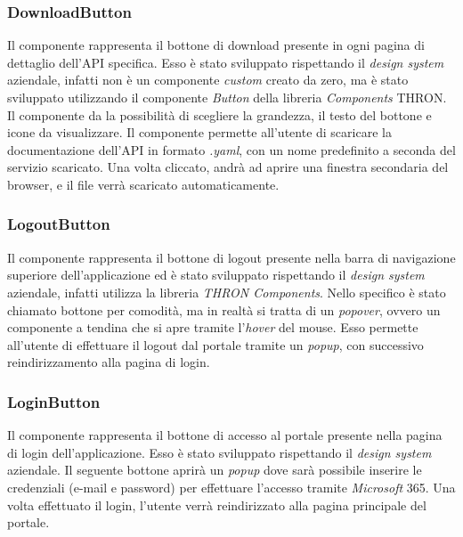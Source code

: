 \subsubsection{DownloadButton}\label{subsubsec:download-button}
Il componente rappresenta il bottone di download presente in ogni pagina di dettaglio dell'API specifica. Esso è stato sviluppato rispettando il \textit{design system}
aziendale, infatti non è un componente \textit{custom} creato da zero, ma è stato sviluppato utilizzando il componente \textit{Button} della libreria \textit{Components} THRON.
Il componente da la possibilità di scegliere la grandezza, il testo del bottone e icone da visualizzare.
Il componente permette all'utente di scaricare la documentazione dell'API in formato \textit{.yaml}, con un nome predefinito a seconda 
del servizio scaricato. Una volta cliccato, andrà ad aprire una finestra secondaria del browser, e il file verrà scaricato automaticamente.\\

\subsubsection{LogoutButton}\label{subsubsec:logout-button}
Il componente rappresenta il bottone di logout presente nella barra di navigazione superiore 
dell'applicazione ed è stato sviluppato rispettando il \textit{design system} 
aziendale, infatti utilizza la libreria \textit{THRON Components}.
Nello specifico è stato chiamato bottone per comodità, ma in realtà si tratta di un \textit{popover}, ovvero un componente a tendina che si apre
tramite l'\textit{hover} del mouse. Esso permette all'utente di effettuare il logout dal portale tramite un \textit{popup}, con successivo reindirizzamento
alla pagina di login.


\subsubsection{LoginButton}\label{subsubsec:login-button}
Il componente rappresenta il bottone di accesso al portale presente nella pagina di login dell'applicazione. Esso è stato sviluppato rispettando il \textit{design system} aziendale.
Il seguente bottone aprirà un \textit{popup} dove sarà possibile inserire le credenziali (e-mail e password) per effettuare l'accesso tramite \textit{Microsoft} 365.
Una volta effettuato il login, l'utente verrà reindirizzato alla pagina principale del portale.

